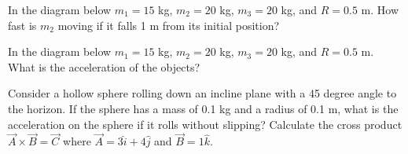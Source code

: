 \documentclass[12pt]{article}
\newcommand{\ihat}{\hat{i}}
\newcommand{\jhat}{\hat{j}}
\newcommand{\khat}{\hat{k}}
\begin{document}
\noindent In the diagram below $m_1=15$ kg, $m_2 = 20$ kg, $m_3=20$ kg, and $R=0.5$ m.  How fast is $m_2$ moving if it falls 1 m from its initial position?

\resizebox{3cm}{!}{}
\newpage
\noindent \noindent In the diagram below $m_1=15$ kg, $m_2 = 20$ kg, $m_3=20$ kg, and $R=0.5$ m.  What is the acceleration of the objects?

\resizebox{3cm}{!}{}

\newpage
\noindent Consider a hollow sphere rolling down an incline plane with a 45 degree angle to the horizon.  If the sphere has a mass of 0.1 kg and a radius of 0.1 m, what is the acceleration on the sphere if it rolls without slipping?
\newpage
\noindent Calculate the cross product $\vec{A} \times \vec{B} = \vec{C}$ where $\vec{A} = 3\ihat + 4\jhat$ and $\vec{B} = 1\khat$.
\end{document}
